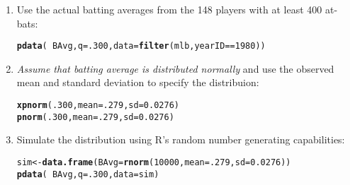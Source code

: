 \documentclass[10pt]{article}\usepackage[]{graphicx}\usepackage[]{color}
\makeatletter
\newcommand{\hlnum}[1]{\textcolor[rgb]{0.686,0.059,0.569}{#1}}%
\newcommand{\hlopt}[1]{\textcolor[rgb]{0,0,0}{#1}}%
\newcommand{\hlstd}[1]{\textcolor[rgb]{0.345,0.345,0.345}{#1}}%
\newcommand{\hlkwb}[1]{\textcolor[rgb]{0.69,0.353,0.396}{#1}}%
\newcommand{\hlkwc}[1]{\textcolor[rgb]{0.333,0.667,0.333}{#1}}%
\newcommand{\hlkwd}[1]{\textcolor[rgb]{0.737,0.353,0.396}{\textbf{#1}}}%
\newenvironment{kframe}{%
 \def\at@end@of@kframe{}%
 \ifinner\ifhmode%
  \def\at@end@of@kframe{\end{minipage}}%
  \begin{minipage}{\columnwidth}%
 \fi\fi%
 \def\FrameCommand##1{\hskip\@totalleftmargin \hskip-\fboxsep
 \colorbox{shadecolor}{##1}\hskip-\fboxsep
     \hskip-\linewidth \hskip-\@totalleftmargin \hskip\columnwidth}%
 \MakeFramed {\advance\hsize-\width
   \@totalleftmargin\z@ \linewidth\hsize
   \@setminipage}}%
 {\par\unskip\endMakeFramed%
 \at@end@of@kframe}
\newenvironment{knitrout}{}{} %
\makeatother
\begin{document}
\begin{enumerate}
  \item Use the actual batting averages from the 148 players with at least 400 at-bats:
  
\begin{knitrout}
\color{fgcolor}\begin{kframe}
\begin{alltt}
\hlkwd{pdata}\hlstd{(}\hlopt{~}\hlstd{BAvg,} \hlkwc{q} \hlstd{=} \hlnum{.300}\hlstd{,} \hlkwc{data} \hlstd{=} \hlkwd{filter}\hlstd{(mlb, yearID} \hlopt{==} \hlnum{1980}\hlstd{))}
\end{alltt}
\end{kframe}
\end{knitrout}

  \item \emph{Assume that batting average is distributed normally} and use the observed mean and standard deviation to specify the distribuion:
  
\begin{knitrout}
\color{fgcolor}\begin{kframe}
\begin{alltt}
\hlkwd{xpnorm}\hlstd{(}\hlnum{.300}\hlstd{,} \hlkwc{mean} \hlstd{=} \hlnum{.279}\hlstd{,} \hlkwc{sd} \hlstd{=} \hlnum{0.0276}\hlstd{)}
\hlkwd{pnorm}\hlstd{(}\hlnum{.300}\hlstd{,} \hlkwc{mean} \hlstd{=} \hlnum{.279}\hlstd{,} \hlkwc{sd} \hlstd{=} \hlnum{0.0276}\hlstd{)}
\end{alltt}
\end{kframe}
\end{knitrout}

  \item Simulate the distribution using R's random number generating capabilities:
\begin{knitrout}
\color{fgcolor}\begin{kframe}
\begin{alltt}
\hlstd{sim} \hlkwb{<-} \hlkwd{data.frame}\hlstd{(}\hlkwc{BAvg} \hlstd{=} \hlkwd{rnorm}\hlstd{(}\hlnum{10000}\hlstd{,} \hlkwc{mean} \hlstd{=} \hlnum{.279}\hlstd{,} \hlkwc{sd} \hlstd{=} \hlnum{0.0276}\hlstd{))}
\hlkwd{pdata}\hlstd{(}\hlopt{~}\hlstd{BAvg,} \hlkwc{q} \hlstd{=} \hlnum{.300}\hlstd{,} \hlkwc{data} \hlstd{= sim)}
\end{alltt}
\end{kframe}
\end{knitrout}




\end{enumerate}
\end{document}
